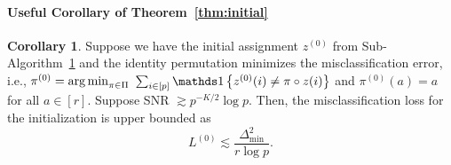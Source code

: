 \documentclass[lettersize,onecolumn,journal]{IEEEtran}
\theoremstyle{definition}
\newtheorem{cor}{Corollary}
\theoremstyle{definition}
\newcommand{\offf}[1]{\left\{#1\right\}}
\begin{document}
\paragraph{Useful Corollary of Theorem~\ref{thm:initial}} 

\begin{cor}\label{cor:L0} Suppose we have the initial assignment $z^{(0)}$ from Sub-Algorithm~\hyperref[alg:main]{1} and the identity permutation minimizes 
the misclassification error, i.e., $\pi^{(0)} = \operatorname*{arg\,min}_{\pi \in \Pi} $ $ \sum_{i \in [p]}\ind \offf{z^{(0)}(i) \neq \pi \circ z(i) }$ and $\pi^{(0)}(a) = a$ for all $ a \in [r]$. Suppose SNR $\gtrsim p^{-K/2} \log p$. Then, the misclassification loss for the initialization is upper bounded as 
\begin{equation}
    L^{(0)} \lesssim \frac{\Delta_{\min}^2}{r \log p}.
\end{equation}
\end{cor}
\end{document}
